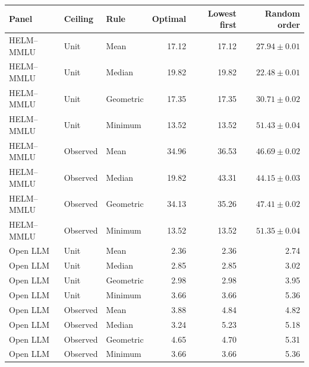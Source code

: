 \begin{tabular}{lllrrr}
\toprule
Panel & Ceiling & Rule & Optimal & Lowest first & Random order \\
\midrule
HELM--MMLU & Unit & Mean & 17.12 & 17.12 & $27.94\pm0.01$ \\
HELM--MMLU & Unit & Median & 19.82 & 19.82 & $22.48\pm0.01$ \\
HELM--MMLU & Unit & Geometric & 17.35 & 17.35 & $30.71\pm0.02$ \\
HELM--MMLU & Unit & Minimum & 13.52 & 13.52 & $51.43\pm0.04$ \\
HELM--MMLU & Observed & Mean & 34.96 & 36.53 & $46.69\pm0.02$ \\
HELM--MMLU & Observed & Median & 19.82 & 43.31 & $44.15\pm0.03$ \\
HELM--MMLU & Observed & Geometric & 34.13 & 35.26 & $47.41\pm0.02$ \\
HELM--MMLU & Observed & Minimum & 13.52 & 13.52 & $51.35\pm0.04$ \\
Open LLM & Unit & Mean & 2.36 & 2.36 & 2.74 \\
Open LLM & Unit & Median & 2.85 & 2.85 & 3.02 \\
Open LLM & Unit & Geometric & 2.98 & 2.98 & 3.95 \\
Open LLM & Unit & Minimum & 3.66 & 3.66 & 5.36 \\
Open LLM & Observed & Mean & 3.88 & 4.84 & 4.82 \\
Open LLM & Observed & Median & 3.24 & 5.23 & 5.18 \\
Open LLM & Observed & Geometric & 4.65 & 4.70 & 5.31 \\
Open LLM & Observed & Minimum & 3.66 & 3.66 & 5.36 \\
\bottomrule
\end{tabular}
